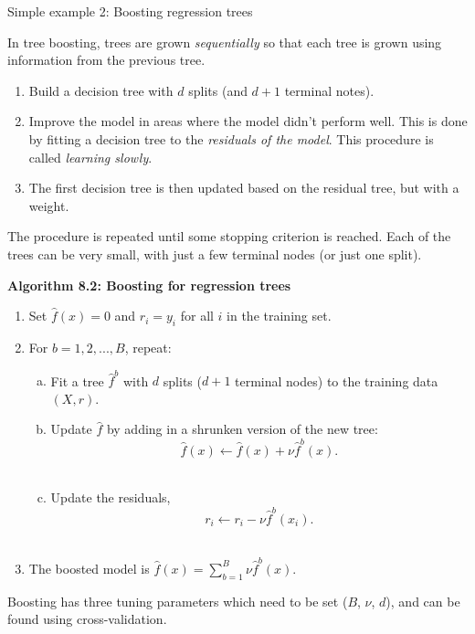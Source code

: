 \documentclass[
  10pt,
  ignorenonframetext,
]{beamer}
\providecommand{\tightlist}{%
  \setlength{\itemsep}{0pt}\setlength{\parskip}{0pt}}
\begin{document}
\begin{frame}{Simple example 2: Boosting regression trees}
\label{simple-example-2-boosting-regression-trees}
\(~\)

In tree boosting, trees are grown \emph{sequentially} so that each tree
is grown using information from the previous tree.

\vspace{2mm}

\begin{enumerate}
\tightlist
\item
  Build a decision tree with \(d\) splits (and \(d+1\) terminal notes).
\item
  Improve the model in areas where the model didn't perform well. This
  is done by fitting a decision tree to the \emph{residuals of the
  model}. This procedure is called \emph{learning slowly}.
\item
  The first decision tree is then updated based on the residual tree,
  but with a weight.
\end{enumerate}

The procedure is repeated until some stopping criterion is reached. Each
of the trees can be very small, with just a few terminal nodes (or just
one split).
\end{frame}

\begin{frame}
\textbf{Algorithm 8.2: Boosting for regression trees}

\vspace{2mm}

\begin{enumerate}
\tightlist
\item
  Set \(\hat{f}(x) = 0\) and \(r_i = y_i\) for all \(i\) in the training
  set.
\item
  For \(b=1,2,...,B\), repeat:

  \begin{enumerate}
  [a)]
  \tightlist
  \item
    Fit a tree \(\hat{f}^b\) with \(d\) splits (\(d+1\) terminal nodes)
    to the training data \((X,r)\).\\
  \item
    Update \(\hat{f}\) by adding in a shrunken version of the new tree:
    \[\hat{f}(x) \leftarrow \hat{f}(x)+\nu \hat{f}^b(x).\]\\
  \item
    Update the residuals, \[r_i \leftarrow r_i - \nu \hat{f}^b(x_i).\]\\
  \end{enumerate}
\item
  The boosted model is \(\hat{f}(x) = \sum_{b=1}^B \nu \hat{f}^b(x).\)
\end{enumerate}

\vspace{4mm}

Boosting has three tuning parameters which need to be set (\(B\),
\(\nu\), \(d\)), and can be found using cross-validation.
\end{frame}
\end{document}

